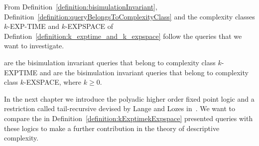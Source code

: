 From Definition~\ref{definition:bisimulationInvariant}, Definition~\ref{definition:queryBelongsToComplexityClass}
and the complexity classes $k$-EXP-TIME and $k$-EXPSPACE of Defintion~\ref{definition:k_exptime_and_k_expspace} follow
the queries that we want to investigate.

\begin{definition}
    \label{definition:kExptimekExpspace}
     are the bisimulation invariant queries that belong to complexity class $k$-EXPTIME and
     are the bisimulation invariant queries that belong to complexity class $k$-EXSPACE, where $k \geq 0$.
\end{definition}

In the next chapter we introduce the polyadic higher order fixed point logic and a restriction called tail-recursive
devised by Lange and Lozes in~\cite{lange2014capturing}. We want to compare the in
Definition~\ref{definition:kExptimekExpspace} presented queries with these logics to make a further contribution in
the theory of descriptive complexity.